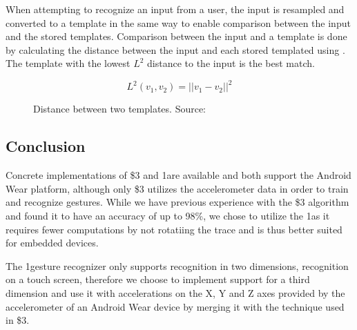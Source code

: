 When attempting to recognize an input from a user, the input is resampled and converted to a template in the same way to enable comparison between the input and the stored templates.
Comparison between the input and a template is done by calculating the distance between the input and each stored templated using .
The template with the lowest $L^2$ distance to the input is the best match.

\begin{figure}[h]
\[ L^{2}(v_1, v_2) = \lvert\lvert v_1 - v_2 \rvert\rvert^2 \]
\label{eq:one-cent-l-squared}
\caption{Distance between two templates. Source: \cite{herold20121}}
\end{figure}

\subsection{Conclusion}

Concrete implementations of \$3 and 1\textcent are available and both support the Android Wear platform, although only \$3 utilizes the accelerometer data in order to train and recognize gestures. While we have previous experience with the \$3 algorithm and found it to have an accuracy of up to 98\%, we chose to utilize the 1\textcent as it requires fewer computations by not rotatiing the trace and is thus better suited for embedded devices.

The 1\textcent gesture recognizer only supports recognition in two dimensions, \eg recognition on a touch screen, therefore we choose to implement support for a third dimension and use it with accelerations on the X, Y and Z axes provided by the accelerometer of an Android Wear device by merging it with the technique used in \$3.

